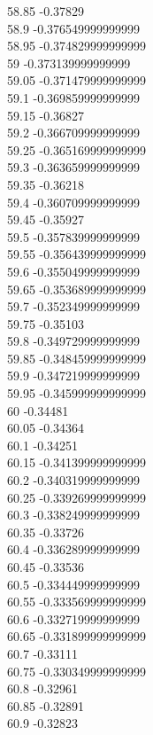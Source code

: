 {58.85	-0.37829\\
58.9	-0.376549999999999\\
58.95	-0.374829999999999\\
59	-0.373139999999999\\
59.05	-0.371479999999999\\
59.1	-0.369859999999999\\
59.15	-0.36827\\
59.2	-0.366709999999999\\
59.25	-0.365169999999999\\
59.3	-0.363659999999999\\
59.35	-0.36218\\
59.4	-0.360709999999999\\
59.45	-0.35927\\
59.5	-0.357839999999999\\
59.55	-0.356439999999999\\
59.6	-0.355049999999999\\
59.65	-0.353689999999999\\
59.7	-0.352349999999999\\
59.75	-0.35103\\
59.8	-0.349729999999999\\
59.85	-0.348459999999999\\
59.9	-0.347219999999999\\
59.95	-0.345999999999999\\
60	-0.34481\\
60.05	-0.34364\\
60.1	-0.34251\\
60.15	-0.341399999999999\\
60.2	-0.340319999999999\\
60.25	-0.339269999999999\\
60.3	-0.338249999999999\\
60.35	-0.33726\\
60.4	-0.336289999999999\\
60.45	-0.33536\\
60.5	-0.334449999999999\\
60.55	-0.333569999999999\\
60.6	-0.332719999999999\\
60.65	-0.331899999999999\\
60.7	-0.33111\\
60.75	-0.330349999999999\\
60.8	-0.32961\\
60.85	-0.32891\\
60.9	-0.32823\\
}
